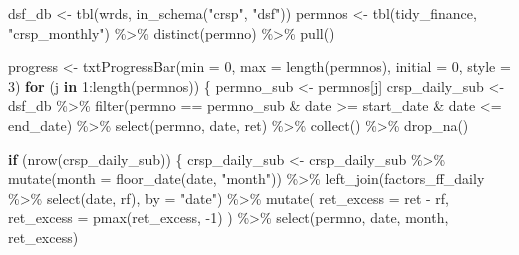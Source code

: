\documentclass[
]{krantz}
\newenvironment{Shaded}{\begin{snugshade}}{\end{snugshade}}
\newcommand{\AttributeTok}[1]{\textcolor[rgb]{0.61,0.61,0.61}{#1}}
\newcommand{\ControlFlowTok}[1]{\textcolor[rgb]{0.27,0.27,0.27}{\textbf{#1}}}
\newcommand{\DecValTok}[1]{\textcolor[rgb]{0.06,0.06,0.06}{#1}}
\newcommand{\FunctionTok}[1]{\textcolor[rgb]{0,0,0}{#1}}
\newcommand{\NormalTok}[1]{#1}
\newcommand{\OtherTok}[1]{\textcolor[rgb]{0.37,0.37,0.37}{#1}}
\newcommand{\SpecialCharTok}[1]{\textcolor[rgb]{0,0,0}{#1}}
\newcommand{\StringTok}[1]{\textcolor[rgb]{0.5,0.5,0.5}{#1}}
\begin{document}
\begin{Shaded}
\begin{Highlighting}[]
\NormalTok{dsf\_db }\OtherTok{\textless{}{-}} \FunctionTok{tbl}\NormalTok{(wrds, }\FunctionTok{in\_schema}\NormalTok{(}\StringTok{"crsp"}\NormalTok{, }\StringTok{"dsf"}\NormalTok{))}
\NormalTok{permnos }\OtherTok{\textless{}{-}} \FunctionTok{tbl}\NormalTok{(tidy\_finance, }\StringTok{"crsp\_monthly"}\NormalTok{) }\SpecialCharTok{\%\textgreater{}\%}
  \FunctionTok{distinct}\NormalTok{(permno) }\SpecialCharTok{\%\textgreater{}\%}
  \FunctionTok{pull}\NormalTok{()}

\NormalTok{progress }\OtherTok{\textless{}{-}} \FunctionTok{txtProgressBar}\NormalTok{(}\AttributeTok{min =} \DecValTok{0}\NormalTok{, }\AttributeTok{max =} \FunctionTok{length}\NormalTok{(permnos), }\AttributeTok{initial =} \DecValTok{0}\NormalTok{, }\AttributeTok{style =} \DecValTok{3}\NormalTok{)}
\ControlFlowTok{for}\NormalTok{ (j }\ControlFlowTok{in} \DecValTok{1}\SpecialCharTok{:}\FunctionTok{length}\NormalTok{(permnos)) \{}
\NormalTok{  permno\_sub }\OtherTok{\textless{}{-}}\NormalTok{ permnos[j]}
\NormalTok{  crsp\_daily\_sub }\OtherTok{\textless{}{-}}\NormalTok{ dsf\_db }\SpecialCharTok{\%\textgreater{}\%}
    \FunctionTok{filter}\NormalTok{(permno }\SpecialCharTok{==}\NormalTok{ permno\_sub }\SpecialCharTok{\&}
\NormalTok{      date }\SpecialCharTok{\textgreater{}=}\NormalTok{ start\_date }\SpecialCharTok{\&}\NormalTok{ date }\SpecialCharTok{\textless{}=}\NormalTok{ end\_date) }\SpecialCharTok{\%\textgreater{}\%}
    \FunctionTok{select}\NormalTok{(permno, date, ret) }\SpecialCharTok{\%\textgreater{}\%}
    \FunctionTok{collect}\NormalTok{() }\SpecialCharTok{\%\textgreater{}\%}
    \FunctionTok{drop\_na}\NormalTok{()}

  \ControlFlowTok{if}\NormalTok{ (}\FunctionTok{nrow}\NormalTok{(crsp\_daily\_sub)) \{}
\NormalTok{    crsp\_daily\_sub }\OtherTok{\textless{}{-}}\NormalTok{ crsp\_daily\_sub }\SpecialCharTok{\%\textgreater{}\%}
      \FunctionTok{mutate}\NormalTok{(}\AttributeTok{month =} \FunctionTok{floor\_date}\NormalTok{(date, }\StringTok{"month"}\NormalTok{)) }\SpecialCharTok{\%\textgreater{}\%}
      \FunctionTok{left\_join}\NormalTok{(factors\_ff\_daily }\SpecialCharTok{\%\textgreater{}\%}
        \FunctionTok{select}\NormalTok{(date, rf), }\AttributeTok{by =} \StringTok{"date"}\NormalTok{) }\SpecialCharTok{\%\textgreater{}\%}
      \FunctionTok{mutate}\NormalTok{(}
        \AttributeTok{ret\_excess =}\NormalTok{ ret }\SpecialCharTok{{-}}\NormalTok{ rf,}
        \AttributeTok{ret\_excess =} \FunctionTok{pmax}\NormalTok{(ret\_excess, }\SpecialCharTok{{-}}\DecValTok{1}\NormalTok{)}
\NormalTok{      ) }\SpecialCharTok{\%\textgreater{}\%}
      \FunctionTok{select}\NormalTok{(permno, date, month, ret\_excess)}


\end{Highlighting}
\end{Shaded}
\end{document}

